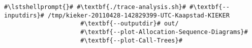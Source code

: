 \begin{lstlisting}[caption=Commands to produce the diagrams under \UnixLikeSystems,label=lst:traceAnalysis:sequenceDiagram]
#\lstshellprompt{}# #\textbf{./trace-analysis.sh}# #\textbf{--inputdirs}# /tmp/kieker-20110428-142829399-UTC-Kaapstad-KIEKER
                     #\textbf{--outputdir}# out/
                     #\textbf{--plot-Allocation-Sequence-Diagrams}#
                     #\textbf{--plot-Call-Trees}#							 
\end{lstlisting}

